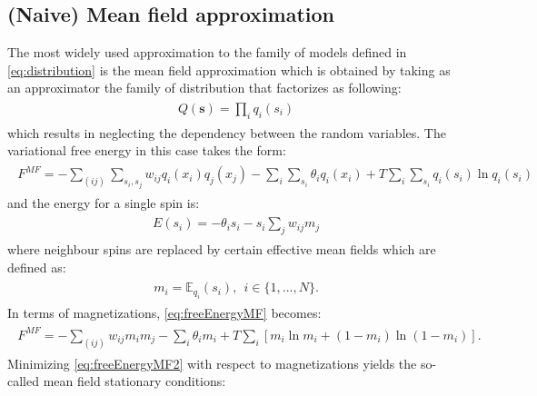 \documentclass[../report/report.tex]{subfiles}
\begin{document}

\subsection{(Naive) Mean field approximation}
The most widely used approximation to the family of models defined in \ref{eq:distribution} is the mean field approximation which is obtained by taking as an approximator the family of distribution that factorizes as following:
\begin{align}
\begin{split}
Q(\mathbf{s}) = \prod_i q_i(s_i)
\end{split}
\end{align}
which results in neglecting the dependency between the random variables. The variational free energy in this case takes the form:
\begin{align}
\begin{split}
F^{MF} = - \sum_{(ij)} \sum_{s_i, s_j} w_{ij} q_i(x_i)q_j(x_j) - \sum_{i}\sum_{s_i} \theta_i q_i(x_i) + T\sum_i \sum_{s_i} q_i(s_i)\ln q_i(s_i)
\label{eq:freeEnergyMF}
\end{split}
\end{align}
and the energy for a single spin is:
\begin{align}
\begin{split}
E(s_i) = - \theta_i s_i - s_i \sum_j  w_{ij} m_j
\end{split}
\end{align}
where neighbour spins are replaced by certain effective mean fields which are defined as:
 \begin{align}
\begin{split}
m_i = \mathbb{E}_{q_i} (s_i), ~~ i \in \{1, ..., N\}.
\end{split}
\end{align}
 In terms of magnetizations, \ref{eq:freeEnergyMF} becomes:
\begin{align}
\begin{split}
F^{MF} = - \sum_{(ij)} w_{ij} m_i m_j - \sum_{i} \theta_i m_i  + T\sum_i \left[ m_i \ln m_i + (1-m_i)\ln(1-m_i) \right].
\label{eq:freeEnergyMF2}
\end{split}
\end{align}
Minimizing \ref{eq:freeEnergyMF2} with respect to magnetizations yields the so-called mean field stationary conditions:
\end{document}
